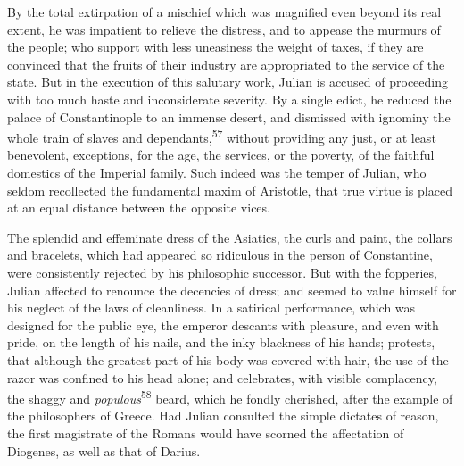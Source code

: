 


By the total extirpation of a mischief which was magnified even
beyond its real extent, he was impatient to relieve the distress,
and to appease the murmurs of the people; who support with less
uneasiness the weight of taxes, if they are convinced that the
fruits of their industry are appropriated to the service of the
state. But in the execution of this salutary work, Julian is
accused of proceeding with too much haste and inconsiderate
severity. By a single edict, he reduced the palace of
Constantinople to an immense desert, and dismissed with ignominy
the whole train of slaves and dependants,\textsuperscript{57} without providing
any just, or at least benevolent, exceptions, for the age, the
services, or the poverty, of the faithful domestics of the
Imperial family. Such indeed was the temper of Julian, who seldom
recollected the fundamental maxim of Aristotle, that true virtue
is placed at an equal distance between the opposite vices.

The splendid and effeminate dress of the Asiatics, the curls and
paint, the collars and bracelets, which had appeared so
ridiculous in the person of Constantine, were consistently
rejected by his philosophic successor. But with the fopperies,
Julian affected to renounce the decencies of dress; and seemed to
value himself for his neglect of the laws of cleanliness. In a
satirical performance, which was designed for the public eye, the
emperor descants with pleasure, and even with pride, on the
length of his nails, and the inky blackness of his hands;
protests, that although the greatest part of his body was covered
with hair, the use of the razor was confined to his head alone;
and celebrates, with visible complacency, the shaggy and
\textit{populous}\textsuperscript{58} beard, which he fondly cherished, after the example
of the philosophers of Greece. Had Julian consulted the simple
dictates of reason, the first magistrate of the Romans would have
scorned the affectation of Diogenes, as well as that of Darius.

